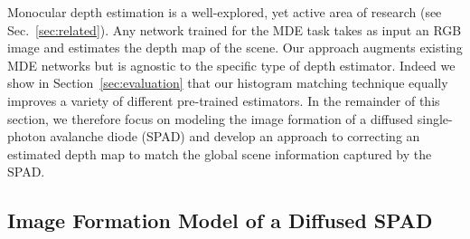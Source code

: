 Monocular depth estimation is a well-explored, yet active area of research (see Sec.~\ref{sec:related}). Any network trained for the MDE task takes as input an RGB image and estimates the depth map of the scene. Our approach augments existing MDE networks but is agnostic to the specific type of depth estimator. Indeed we show in Section~\ref{sec:evaluation} that our histogram matching technique equally improves a variety of different pre-trained estimators. In the remainder of this section, we therefore focus on modeling the image formation of a diffused single-photon avalanche diode (SPAD) and develop an approach to correcting an estimated depth map to match the global scene information captured by the SPAD.


\subsection{Image Formation Model of a Diffused SPAD}

